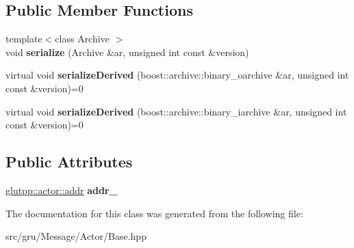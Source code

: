 \subsection*{\-Public \-Member \-Functions}
\begin{DoxyCompactItemize}
\item 
\hypertarget{classNeb_1_1Message_1_1Actor_1_1Base_a961a74203562be229bb3bd1a047dc6d2}{{\footnotesize template$<$class Archive $>$ }\\void {\bfseries serialize} (\-Archive \&ar, unsigned int const \&version)}\label{classNeb_1_1Message_1_1Actor_1_1Base_a961a74203562be229bb3bd1a047dc6d2}

\item 
\hypertarget{classNeb_1_1Message_1_1Actor_1_1Base_a81b750ebdc5e296d9ea892fe8e069934}{virtual void {\bfseries serialize\-Derived} (boost\-::archive\-::binary\-\_\-oarchive \&ar, unsigned int const \&version)=0}\label{classNeb_1_1Message_1_1Actor_1_1Base_a81b750ebdc5e296d9ea892fe8e069934}

\item 
\hypertarget{classNeb_1_1Message_1_1Actor_1_1Base_a32fc3888e2723e8babdb9d131bac7692}{virtual void {\bfseries serialize\-Derived} (boost\-::archive\-::binary\-\_\-iarchive \&ar, unsigned int const \&version)=0}\label{classNeb_1_1Message_1_1Actor_1_1Base_a32fc3888e2723e8babdb9d131bac7692}

\end{DoxyCompactItemize}
\subsection*{\-Public \-Attributes}
\begin{DoxyCompactItemize}
\item 
\hypertarget{classNeb_1_1Message_1_1Actor_1_1Base_af9251bc98dac471dfa943dd441b0aa3b}{\hyperlink{classglutpp_1_1actor_1_1addr}{glutpp\-::actor\-::addr} {\bfseries addr\-\_\-}}\label{classNeb_1_1Message_1_1Actor_1_1Base_af9251bc98dac471dfa943dd441b0aa3b}

\end{DoxyCompactItemize}


\-The documentation for this class was generated from the following file\-:\begin{DoxyCompactItemize}
\item 
src/gru/\-Message/\-Actor/\-Base.\-hpp\end{DoxyCompactItemize}
